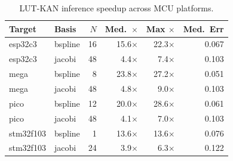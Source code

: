 \begin{table}[t]
\centering
\caption{LUT-KAN inference speedup across MCU platforms.}
\label{tab:mcu_speedup}
\begin{tabular}{llrrrr}
\toprule
Target & Basis & $N$ & Med.\ $\times$ & Max $\times$ & Med.\ Err \\
\midrule
esp32c3 & bspline & 16 & 15.6$\times$ & 22.3$\times$ & 0.067 \\
esp32c3 & jacobi & 48 & 4.4$\times$ & 7.4$\times$ & 0.103 \\
mega & bspline & 8 & 23.8$\times$ & 27.2$\times$ & 0.051 \\
mega & jacobi & 48 & 4.8$\times$ & 9.0$\times$ & 0.103 \\
pico & bspline & 12 & 20.0$\times$ & 28.6$\times$ & 0.061 \\
pico & jacobi & 48 & 4.1$\times$ & 7.0$\times$ & 0.103 \\
stm32f103 & bspline & 1 & 13.6$\times$ & 13.6$\times$ & 0.076 \\
stm32f103 & jacobi & 24 & 3.9$\times$ & 6.3$\times$ & 0.122 \\
\bottomrule
\end{tabular}
\end{table}